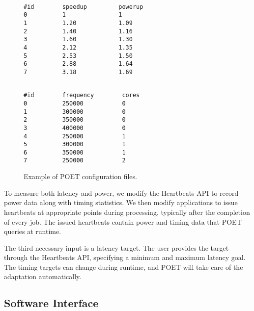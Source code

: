 \begin{figure}[t]
\centering
\begin{minipage}{.45\columnwidth}
\lstset{
  belowskip=0pt,
  aboveskip=0pt,
}
\begin{lstlisting}[frame=tlr,%
  caption={System-agnostic.},%
  label={lst:control_config_example}]%

#id        speedup         powerup
0          1               1
1          1.20            1.09
2          1.40            1.16
3          1.60            1.30
4          2.12            1.35
5          2.53            1.50
6          2.88            1.64
7          3.18            1.69
\end{lstlisting}
\end{minipage}
\hspace*{0.4cm}
\begin{minipage}{.45\columnwidth}
\lstset{
  belowskip=0pt,
  aboveskip=0pt,
}
\begin{lstlisting}[frame=tlr,%
  caption={System-specific.},%
  label={lst:cpu_config_example}]%

#id        frequency        cores
0          250000           0
1          300000           0
2          350000           0
3          400000           0
4          250000           1
5          300000           1
6          350000           1
7          250000           2
\end{lstlisting}
\end{minipage}
\caption{Example of POET configuration files.}
\label{fig:config-examples}
\end{figure}

To measure both latency and power, we modify the Heartbeats API \cite{PTRADE} to record power data along with timing statistics.
We then modify applications to issue heartbeats at appropriate points during processing, typically after the completion of every job.
The issued heartbeats contain power and timing data that POET queries at runtime.

The third necessary input is a latency target.
The user provides the target through the Heartbeats API, specifying a minimum and maximum latency goal.
The timing targets can change during runtime, and POET will take care of the adaptation automatically.


\subsection{Software Interface}

